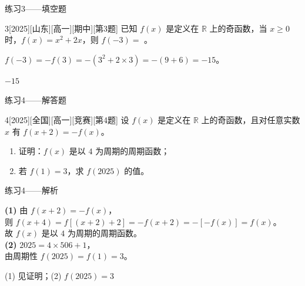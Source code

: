 \begin{frame}{练习3——填空题}
	\begin{exercise}{3}[2025][山东][高一][期中][第3题]
		已知 $f(x)$ 是定义在 $\mathbb{R}$ 上的奇函数，当 $x\ge0$ 时，$f(x)=x^2+2x$，则 $f(-3)=$ \underline{\hspace{1.5cm}}。
	\end{exercise}
	\pause
	\begin{solutions}
		$f(-3)=-f(3)=-(3^2+2\times3)=-(9+6)=-15$。
	\end{solutions}
	\begin{answer}
		$-15$
	\end{answer}
\end{frame}

\begin{frame}{练习4——解答题}
	\begin{exercise}{4}[2025][全国][高一][竞赛][第4题]
		设 $f(x)$ 是定义在 $\mathbb{R}$ 上的奇函数，且对任意实数 $x$ 有 $f(x+2)=-f(x)$。
		\begin{enumerate}
			\item 证明：$f(x)$ 是以 $4$ 为周期的周期函数；
			\item 若 $f(1)=3$，求 $f(2025)$ 的值。
		\end{enumerate}
	\end{exercise}
\end{frame}

\begin{frame}{练习4——解析}
	\begin{solutions}
		\textbf{(1)} 由 $f(x+2)=-f(x)$，\\
		则 $f(x+4)=f[(x+2)+2]=-f(x+2)=-[-f(x)]=f(x)$。\\
		故 $f(x)$ 是以 $4$ 为周期的周期函数。\\[3mm]
		\textbf{(2)} $2025=4\times506+1$，\\
		由周期性 $f(2025)=f(1)=3$。
	\end{solutions}
	\begin{answer}
		(1) 见证明；(2) $f(2025)=3$
	\end{answer}
\end{frame}

